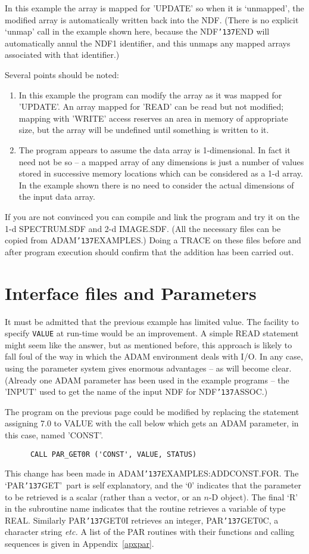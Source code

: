 \documentclass[twoside,11pt]{article}
\renewcommand{\_}{{\tt\char'137}}
\newcommand{\xlabel}[1]{}
\begin{document}
In this example the array is mapped for 'UPDATE' so when it is 
`unmapped', the modified array is automatically written back into the NDF.
(There is no explicit `unmap' call in the example shown here, 
because the NDF\_END will automatically 
annul the NDF1 identifier, and this
unmaps any mapped arrays associated with that identifier.)

Several points should be noted:
\begin{enumerate}
\item In this example the program can modify the array as it was mapped for 
'UPDATE'.
An array mapped for 'READ' can  be read but not modified;
mapping with  'WRITE' access reserves an area in memory of appropriate
size, but the array will be undefined until something is written to it.
\item The program appears to assume the data array is 1-dimensional.
In fact it need not be so -- a mapped array of any dimensions is just
a number of values stored in successive memory locations which  can
be considered as a 1-d array.
In the example shown there is no need to consider the actual dimensions 
of the input data array. 
\end{enumerate}
If you are not convinced you can compile and link the program and try it
on the 1-d SPECTRUM.SDF and 2-d IMAGE.SDF.  (All the necessary files can be
copied from ADAM\_EXAMPLES.)
Doing a TRACE on these files before and after program execution should
confirm that the addition has been carried out.

\newpage
\section{Interface files and Parameters\label{addconst}\xlabel{interface_files_and_paramenters}}

It must be admitted that the previous example has limited value.
The facility to specify {\tt VALUE} at run-time
would be an improvement.
A simple READ statement might seem like the answer, but as mentioned before,
this approach
is likely to fall foul of the way in which the 
ADAM environment deals with I/O.
In any case, using the parameter system gives enormous advantages -- as will
become clear.
(Already one ADAM parameter has been used in the example programs -- the 
'INPUT'  used to get the name of the input NDF for NDF\_ASSOC.)

The program on the previous page could be modified by replacing the 
statement assigning 7.0 to VALUE with the call below which gets an 
ADAM parameter, in this case, named 'CONST'.
\begin{verbatim}
      CALL PAR_GET0R ('CONST', VALUE, STATUS)
\end{verbatim}
This change has been made in ADAM\_EXAMPLES:ADDCONST.FOR.
The `PAR\_GET'\ part is self explanatory,  and the `0' indicates that 
the parameter to be retrieved is a scalar 
(rather than a vector, or an $n$-D object).
The final `R' in the subroutine 
name indicates that the routine retrieves a variable of type REAL.
Similarly PAR\_GET0I retrieves an integer, PAR\_GET0C, a character 
string {\it etc.}
A list of the PAR routines with their functions and calling 
sequences is given in Appendix~\ref{apxpar}.
\end{document}
